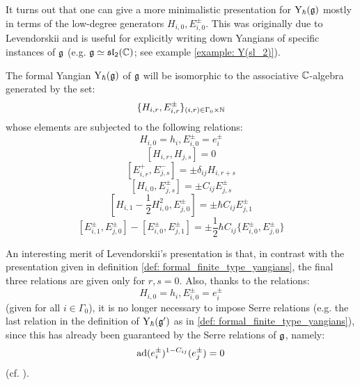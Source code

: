             It turns out that one can give a more minimalistic presentation for $\mathrm{Y}_{\hbar}(\mathfrak{g})$ mostly in terms of the low-degree generators $H_{i, 0}, E_{i, 0}^{\pm}$. This was originally due to Levendorskii and is useful for explicitly writing down Yangians of specific instances of $\mathfrak{g}$ (e.g. $\mathfrak{g} \simeq \mathfrak{sl}_2(\mathbb{C})$; see example \ref{example: Y(sl_2)}).
            \begin{theorem} \label{theorem: levendorskii_presentation}
                \cite[Theorem 1.2]{levendorskii_finite_type_yangians_presentation} The formal Yangian $\mathrm{Y}_{\hbar}(\mathfrak{g})$ of $\mathfrak{g}$ will be isomorphic to the associative $\mathbb{C}$-algebra generated by the set:
                    $$\{ H_{i, r}, E_{i, r}^{\pm} \}_{(i, r) \in \Gamma_0 \x \N}$$
                whose elements are subjected to the following relations:
                    $$H_{i, 0} = h_i, E_{i, 0}^{\pm} = e_i^{\pm}$$
                    $$[ H_{i, r}, H_{j, s} ] = 0$$
                    $$[ E_{i, r}^+, E_{j, s}^- ] = \pm \delta_{ij} H_{i, r + s}$$
                    $$[ H_{i, 0}, E_{j, s}^{\pm} ] = \pm C_{ij} E_{j, s}^{\pm}$$
                    $$\left[ H_{i, 1} - \frac12 H_{i, 0}^2, E_{j, 0}^{\pm} \right] = \pm \hbar C_{ij} E_{j, 1}^{\pm}$$
                    $$[ E_{i, 1}^{\pm}, E_{j, 0}^{\pm} ] - [ E_{i, 0}^{\pm}, E_{j, 1}^{\pm} ] = \pm \frac12 \hbar C_{ij} \{E_{i, 0}^{\pm}, E_{j, 0}^{\pm}\}$$
            \end{theorem}
            \begin{remark}
                An interesting merit of Levendorskii's presentation is that, in contrast with the presentation given in definition \ref{def: formal_finite_type_yangians}, the final three relations are given only for $r, s = 0$. Also, thanks to the relations:
                    $$H_{i, 0} = h_i, E_{i, 0}^{\pm} = e_i^{\pm}$$
                (given for all $i \in \Gamma_0$), it is no longer necessary to impose Serre relations (e.g. the last relation in the definition of $\mathrm{Y}_{\hbar}(\mathfrak{g}')$ as in \ref{def: formal_finite_type_yangians}), since this has already been guaranteed by the Serre relations of $\mathfrak{g}$, namely:
                    $$\mathrm{ad}(e_i^{\pm})^{1 - C_{ij}}( e_j^{\pm} ) = 0$$
                (cf. \cite{humphreys_lie_algebras}).
            \end{remark}
